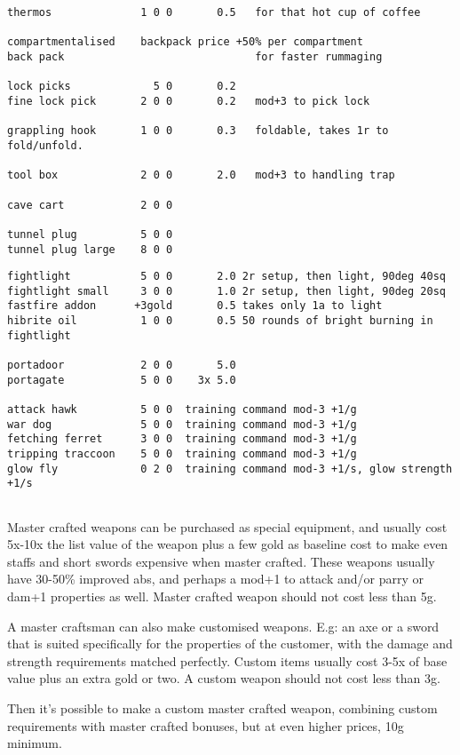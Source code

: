 \begin{verbatim}
thermos              1 0 0       0.5   for that hot cup of coffee

compartmentalised    backpack price +50% per compartment
back pack                              for faster rummaging

lock picks             5 0       0.2
fine lock pick       2 0 0       0.2   mod+3 to pick lock

grappling hook       1 0 0       0.3   foldable, takes 1r to fold/unfold.

tool box             2 0 0       2.0   mod+3 to handling trap

cave cart            2 0 0

tunnel plug          5 0 0
tunnel plug large    8 0 0

\end{verbatim} \goodbreak \begin{verbatim}
fightlight           5 0 0       2.0 2r setup, then light, 90deg 40sq
fightlight small     3 0 0       1.0 2r setup, then light, 90deg 20sq
fastfire addon      +3gold       0.5 takes only 1a to light
hibrite oil          1 0 0       0.5 50 rounds of bright burning in fightlight

portadoor            2 0 0       5.0
portagate            5 0 0    3x 5.0

attack hawk          5 0 0  training command mod-3 +1/g
war dog              5 0 0  training command mod-3 +1/g
fetching ferret      3 0 0  training command mod-3 +1/g
tripping traccoon    5 0 0  training command mod-3 +1/g
glow fly             0 2 0  training command mod-3 +1/s, glow strength +1/s


\end{verbatim}
\normalsize

Master crafted weapons can be purchased as special equipment, and usually cost 5x-10x the list value of the weapon plus a few gold as baseline cost to make even staffs and short swords expensive when master crafted. These weapons usually have 30-50\% improved abs, and perhaps a mod+1 to attack and/or parry or dam+1 properties as well. Master crafted weapon should not cost less than 5g.

A master craftsman can also make customised weapons. E.g: an axe or a sword that is suited specifically for the properties of the customer, with the damage and strength requirements matched perfectly. Custom items usually cost 3-5x of base value plus an extra gold or two. A custom weapon should not cost less than 3g.

Then it's possible to make a custom master crafted weapon, combining custom requirements with master crafted bonuses, but at even higher prices, 10g minimum.

